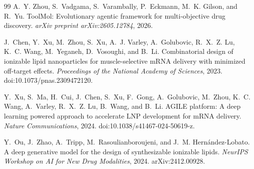 \begin{thebibliography}{99}
A.~Y. Zhou, S.~Vadgama, S.~Varambally, P.~Eckmann, M.~K. Gilson, and R.~Yu.
ToolMol: Evolutionary agentic framework for multi-objective drug discovery.
\emph{arXiv preprint arXiv:2605.12784}, 2026.

J.~Chen, Y.~Xu, M.~Zhou, S.~Xu, A.~J. Varley, A.~Golubovic, R.~X.~Z. Lu, K.~C. Wang, M.~Yeganeh, D.~Vosoughi, and B.~Li.
Combinatorial design of ionizable lipid nanoparticles for muscle-selective mRNA delivery with minimized off-target effects.
\emph{Proceedings of the National Academy of Sciences}, 2023. doi:10.1073/pnas.2309472120.

Y.~Xu, S.~Ma, H.~Cui, J.~Chen, S.~Xu, F.~Gong, A.~Golubovic, M.~Zhou, K.~C. Wang, A.~Varley, R.~X.~Z. Lu, B.~Wang, and B.~Li.
AGILE platform: A deep learning powered approach to accelerate LNP development for mRNA delivery.
\emph{Nature Communications}, 2024. doi:10.1038/s41467-024-50619-z.

Y.~Ou, J.~Zhao, A.~Tripp, M.~Rasoulianboroujeni, and J.~M. Hern\'andez-Lobato.
A deep generative model for the design of synthesizable ionizable lipids.
\emph{NeurIPS Workshop on AI for New Drug Modalities}, 2024. arXiv:2412.00928.
\end{thebibliography}